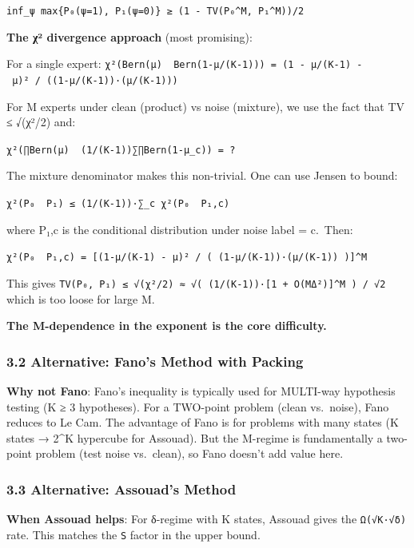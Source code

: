 \documentclass[
  12pt,
]{ctexart}
\begin{document}
\texttt{inf\_ψ\ max\{P₀(ψ=1),\ P₁(ψ=0)\}\ ≥\ (1\ -\ TV(P₀\^{}M,\ P₁\^{}M))/2}

\textbf{The χ² divergence approach} (most promising):

For a single expert:
\texttt{χ²(Bern(μ)\ \textbar{}\textbar{}\ Bern(1-μ/(K-1)))\ =\ (1\ -\ μ/(K-1)\ -\ μ)²\ /\ ((1-μ/(K-1))·(μ/(K-1)))}

For M experts under clean (product) vs noise (mixture), we use the fact
that TV ≤ √(χ²/2) and:

\texttt{χ²(∏Bern(μ)\ \textbar{}\textbar{}\ (1/(K-1))∑∏Bern(1-μ\_c))\ =\ ?}

The mixture denominator makes this non-trivial. One can use Jensen to
bound:

\texttt{χ²(P₀\ \textbar{}\textbar{}\ P₁)\ ≤\ (1/(K-1))·∑\_c\ χ²(P₀\ \textbar{}\textbar{}\ P₁,c)}

where P₁,c is the conditional distribution under noise label = c.~Then:

\texttt{χ²(P₀\ \textbar{}\textbar{}\ P₁,c)\ =\ {[}(1-μ/(K-1)\ -\ μ)²\ /\ (\ (1-μ/(K-1))·(μ/(K-1))\ ){]}\^{}M}

This gives
\texttt{TV(P₀,\ P₁)\ ≤\ √(χ²/2)\ ≈\ √(\ (1/(K-1))·{[}1\ +\ O(MΔ²){]}\^{}M\ )\ /\ √2}
which is too loose for large M.

\textbf{The M-dependence in the exponent is the core difficulty.}

\subsubsection{3.2 Alternative: Fano's Method with
Packing}\label{alternative-fanos-method-with-packing}

\textbf{Why not Fano}: Fano's inequality is typically used for MULTI-way
hypothesis testing (K ≥ 3 hypotheses). For a TWO-point problem (clean
vs.~noise), Fano reduces to Le Cam. The advantage of Fano is for
problems with many states (K states → 2\^{}K hypercube for Assouad). But
the M-regime is fundamentally a two-point problem (test noise
vs.~clean), so Fano doesn't add value here.

\subsubsection{3.3 Alternative: Assouad's
Method}\label{alternative-assouads-method}

\textbf{When Assouad helps}: For δ-regime with K states, Assouad gives
the \texttt{Ω(√K·√δ)} rate. This matches the
\texttt{\textbar{}S\textbar{}} factor in the upper bound.
\end{document}
